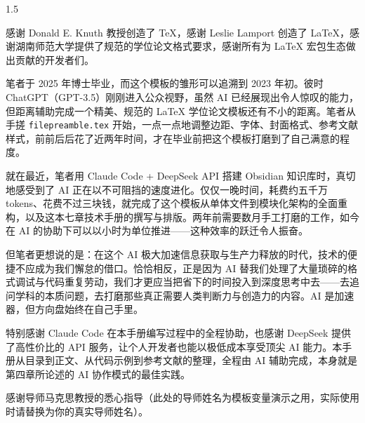 \documentclass[../main-manual.tex]{subfiles}
\begin{document}
\begin{spacing}{1.5}
	\songti {}

	感谢 Donald E. Knuth 教授创造了 \TeX{}，感谢 Leslie Lamport 创造了 \LaTeX{}，感谢湖南师范大学提供了规范的学位论文格式要求，感谢所有为 \LaTeX{} 宏包生态做出贡献的开发者们。

	笔者于 2025 年博士毕业，而这个模板的雏形可以追溯到 2023 年初。彼时 ChatGPT（GPT-3.5）刚刚进入公众视野，虽然 AI 已经展现出令人惊叹的能力，但距离辅助完成一个精美、规范的 \LaTeX{} 学位论文模板还有不小的距离。笔者从手搓 \texttt{filepreamble.tex} 开始，一点一点地调整边距、字体、封面格式、参考文献样式，前前后后花了近两年时间，才在毕业前把这个模板打磨到了自己满意的程度。

	就在最近，笔者用 Claude Code + DeepSeek API 搭建 Obsidian 知识库时，真切地感受到了 AI 正在以不可阻挡的速度进化。仅仅一晚时间，耗费约五千万 tokens、花费不过三块钱，就完成了这个模板从单体文件到模块化架构的全面重构，以及这本七章技术手册的撰写与排版。两年前需要数月手工打磨的工作，如今在 AI 的协助下可以以小时为单位推进——这种效率的跃迁令人振奋。

	但笔者更想说的是：在这个 AI 极大加速信息获取与生产力释放的时代，技术的便捷不应成为我们懈怠的借口。恰恰相反，正是因为 AI 替我们处理了大量琐碎的格式调试与代码重复劳动，我们才更应当把省下的时间投入到深度思考中去——去追问学科的本质问题，去打磨那些真正需要人类判断力与创造力的内容。AI 是加速器，但方向盘始终在自己手里。

	特别感谢 Claude Code 在本手册编写过程中的全程协助，也感谢 DeepSeek 提供了高性价比的 API 服务，让个人开发者也能以极低成本享受顶尖 AI 能力。本手册从目录到正文、从代码示例到参考文献的整理，全程由 AI 辅助完成，本身就是第四章所论述的 AI 协作模式的最佳实践。

	感谢导师马克思教授的悉心指导（此处的导师姓名为模板变量演示之用，实际使用时请替换为你的真实导师姓名）。

	\rightline{\yourtitledate}
\end{spacing}

\cleardoublepage
{}
\thispagestyle{empty}
\end{document}
